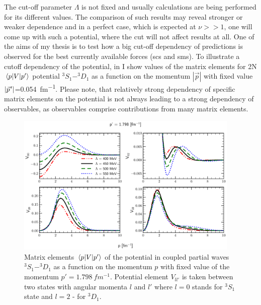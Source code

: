 The cut-off parameter $\Lambda$ is not fixed and usually calculations
are being performed for its different values. The comparison
of such results may reveal stronger or weaker dependence and in a perfect
case, which is expected at $\nu >> 1$, one will come up with such a potential, where the cut will
not affect results at all. One of the aims of my thesis is to test how a big cut-off dependency
of predictions is
observed for the best currently available forces (\gls{scs} and \gls{sms}). 
To illustrate a cutoff dependency of the potential, in  
I show values of the matrix elements for 2N $\matrixel{p}{V}{p^\prime}$ potential $^3S_1-^3D_1$
as a function on the momentum $|\vec{p}|$ with fixed value $|\pvec{p}|$=\SI{0.054}{fm^{-1}}.
Please note, that relatively strong dependency of specific matrix elements on the potential
is not always leading to a strong dependency of observables, as 
observables comprise contributions from many matrix elements.



\begin{figure}[htb]
    \begin{center}
    \includegraphics[width=0.95\textwidth]{PlotData/Deuteron/WAVEFUNC/potential_pp1.798.pdf}
    \end{center}
    \caption{Matrix elements $\matrixel{p}{V}{p^\prime}$ of the potential in
    coupled partial waves $^3S_1 - ^3D_1$ as a function on the momentum $p$ with fixed
    value of the momentum $p'=\SI{1.798}{fm^{-1}}$. Potential element $V_{ll'}$
    is taken between two states with angular momenta  $l$ and $l'$ where $l=0$
    stands  for $^3S_1$ state and $l=2$ - for $^3D_1$. 
    }
    \label{potential_cutoff}
\end{figure}



